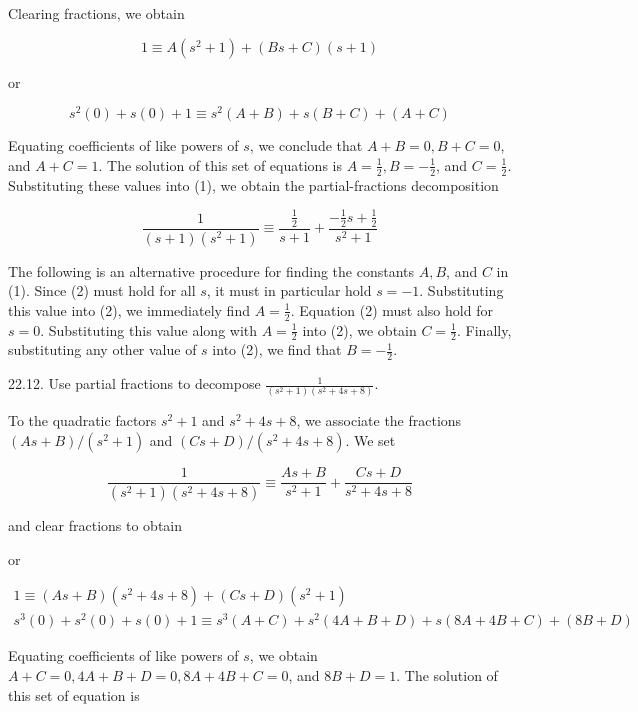 \documentclass[10pt]{article}
\begin{document}
Clearing fractions, we obtain


\begin{equation*}
1 \equiv A\left(s^{2}+1\right)+(B s+C)(s+1) \tag{2}
\end{equation*}


or

$$
s^{2}(0)+s(0)+1 \equiv s^{2}(A+B)+s(B+C)+(A+C)
$$

Equating coefficients of like powers of $s$, we conclude that $A+B=0, B+C=0$, and $A+C=1$. The solution of this set of equations is $A=\frac{1}{2}, B=-\frac{1}{2}$, and $C=\frac{1}{2}$. Substituting these values into (1), we obtain the partial-fractions decomposition

$$
\frac{1}{(s+1)\left(s^{2}+1\right)} \equiv \frac{\frac{1}{2}}{s+1}+\frac{-\frac{1}{2} s+\frac{1}{2}}{s^{2}+1}
$$

The following is an alternative procedure for finding the constants $A, B$, and $C$ in (1). Since (2) must hold for all $s$, it must in particular hold $s=-1$. Substituting this value into (2), we immediately find $A=\frac{1}{2}$. Equation (2) must also hold for $s=0$. Substituting this value along with $A=\frac{1}{2}$ into (2), we obtain $C=\frac{1}{2}$. Finally, substituting any other value of $s$ into (2), we find that $B=-\frac{1}{2}$.

22.12. Use partial fractions to decompose $\frac{1}{\left(s^{2}+1\right)\left(s^{2}+4 s+8\right)}$.

To the quadratic factors $s^{2}+1$ and $s^{2}+4 s+8$, we associate the fractions $(A s+B) /\left(s^{2}+1\right)$ and $(C s+D) /\left(s^{2}+4 s+8\right)$. We set


\begin{equation*}
\frac{1}{\left(s^{2}+1\right)\left(s^{2}+4 s+8\right)} \equiv \frac{A s+B}{s^{2}+1}+\frac{C s+D}{s^{2}+4 s+8} \tag{1}
\end{equation*}


and clear fractions to obtain

or

$$
\begin{gathered}
1 \equiv(A s+B)\left(s^{2}+4 s+8\right)+(C s+D)\left(s^{2}+1\right) \\
s^{3}(0)+s^{2}(0)+s(0)+1 \equiv s^{3}(A+C)+s^{2}(4 A+B+D)+s(8 A+4 B+C)+(8 B+D)
\end{gathered}
$$

Equating coefficients of like powers of $s$, we obtain $A+C=0,4 A+B+D=0,8 A+4 B+C=0$, and $8 B+D=1$. The solution of this set of equation is
\end{document}
